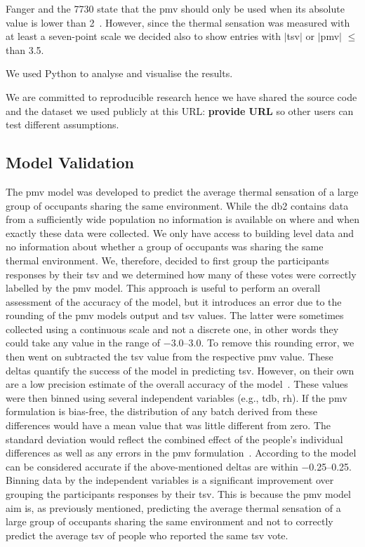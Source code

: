 Fanger and the \gls{7730} state that the \ac{pmv} should only be used when its absolute value is lower than 2~\cite{Fanger1970, iso7730}.
However, since the thermal sensation was measured with at least a seven-point scale we decided also to show entries with $|$\ac{tsv}$|$ or $|$\ac{pmv}$|$ $\leq$ than \num{3.5}.

We used Python to analyse and visualise the results.

We are committed to reproducible research hence we have shared the source code and the dataset we used publicly at this URL: \textbf{provide URL} so other users can test different assumptions.  %

\subsection{Model Validation}\label{subsec:model-validation}
The \ac{pmv} model was developed to predict the average thermal sensation of a large group of occupants sharing the same environment.
While the \gls{db2} contains data from a sufficiently wide population no information is available on where and when exactly these data were collected.
We only have access to building level data and no information about whether a group of occupants was sharing the same thermal environment.
We, therefore, decided to first group the participants responses by their \ac{tsv} and we determined how many of these votes were correctly labelled by the \ac{pmv} model.
This approach is useful to perform an overall assessment of the accuracy of the model, but it introduces an error due to the rounding of the \ac{pmv} models output and \ac{tsv} values.
The latter were sometimes collected using a continuous scale and not a discrete one, in other words they could take any value in the range of \numrange{-3.0}{3.0}.
To remove this rounding error, we then went on subtracted the \ac{tsv} value from the respective \ac{pmv} value.
These deltas quantify the success of the model in predicting \ac{tsv}.
However, on their own are a low precision estimate of the overall accuracy of the model~\cite{Humphreys2002}.
These values were then binned using several independent variables (e.g., \ac{tdb}, \ac{rh}).
If the \ac{pmv} formulation is bias-free, the distribution of any batch derived from these differences would have a mean value that was little different from zero.
The standard deviation would reflect the combined effect of the people's individual differences as well as any errors in the \ac{pmv} formulation~\cite{Humphreys2002}.
According to  the model can be considered accurate if the above-mentioned deltas are within \numrange{-0.25}{0.25}.
Binning data by the independent variables is a significant improvement over grouping the participants responses by their \ac{tsv}.
This is because the \ac{pmv} model aim is, as previously mentioned, predicting the average thermal sensation of a large group of occupants sharing the same environment and not to correctly predict the average \ac{tsv} of people who reported the same \ac{tsv} vote.

